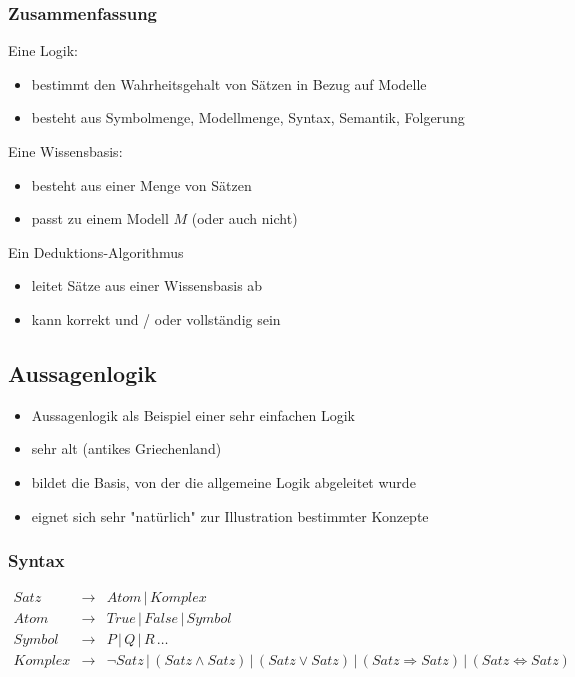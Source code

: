 \subsubsection*{Zusammenfassung}

Eine Logik:
\begin{itemize}
\item bestimmt den Wahrheitsgehalt von Sätzen in Bezug auf Modelle
\item besteht aus Symbolmenge, Modellmenge, Syntax, Semantik, Folgerung
\end{itemize}
Eine Wissensbasis:
\begin{itemize}
\item besteht aus einer Menge von Sätzen
\item passt zu einem Modell $M$ (oder auch nicht)
\end{itemize}
Ein Deduktions-Algorithmus
\begin{itemize}
\item leitet Sätze aus einer Wissensbasis ab
\item kann korrekt und / oder vollständig sein
\end{itemize}

\subsection{Aussagenlogik}

\begin{itemize}
\item Aussagenlogik als Beispiel einer sehr einfachen Logik
\item sehr alt (antikes Griechenland)
\item bildet die Basis, von der die allgemeine Logik abgeleitet wurde
\item eignet sich sehr "{}natürlich"{} zur Illustration bestimmter Konzepte
\end{itemize}

\subsubsection*{Syntax}

\begin{eqnarray*}
Satz &\to& Atom \, | \, Komplex \\ Atom &\to& True \, | \, False \, | \, Symbol \\ Symbol &\to& P \, | \, Q \, | \, R \, \dots \\
Komplex &\to& \neg Satz \, | \, (Satz \wedge Satz) \, | \, (Satz \vee Satz) \, | \, (Satz \Rightarrow Satz) \, | \, (Satz \Leftrightarrow Satz)
\end{eqnarray*}

